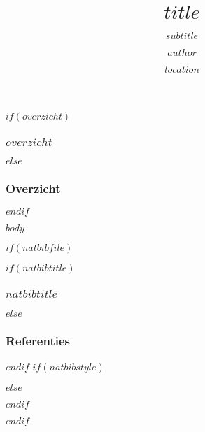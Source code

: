 \documentclass[$if(fontsize)$$fontsize$$else$10pt$endif$, $if(handout)$handout,$endif$ xetex]{beamer}
\title{$title$}
\subtitle{$subtitle$}
\author{$author$}
\institute{$institute$}
\date{$location$}
\date{}
\begin{document}
\begin{frame}[plain]
  \titlepage
\end{frame}

\begin{frame}
$if(overzicht)$
  \frametitle{$overzicht$}
$else$
  \frametitle{Overzicht}
$endif$
	\tableofcontents
\end{frame}

$body$

$if(natbibfile)$
\begin{frame}
$if(natbibtitle)$
\frametitle{$natbibtitle$}
$else$
\frametitle{Referenties}
$endif$
$if(natbibstyle)$

$else$

$endif$
  
\end{frame}
$endif$
\end{document}
